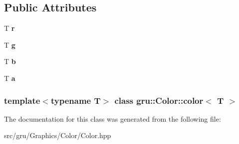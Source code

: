 \subsection*{\-Public \-Attributes}
\begin{DoxyCompactItemize}
\item 
\hypertarget{classgru_1_1Color_1_1color_aee7e839714ca4365e480e9f8af7d51a6}{\-T {\bfseries r}}\label{classgru_1_1Color_1_1color_aee7e839714ca4365e480e9f8af7d51a6}

\item 
\hypertarget{classgru_1_1Color_1_1color_ab3929596a5269939e4e78a22132ac93d}{\-T {\bfseries g}}\label{classgru_1_1Color_1_1color_ab3929596a5269939e4e78a22132ac93d}

\item 
\hypertarget{classgru_1_1Color_1_1color_a8bdd5f13379a4c15567040f27d0e3699}{\-T {\bfseries b}}\label{classgru_1_1Color_1_1color_a8bdd5f13379a4c15567040f27d0e3699}

\item 
\hypertarget{classgru_1_1Color_1_1color_a16a8bbbe15ce0bab9aab97f68a5601cb}{\-T {\bfseries a}}\label{classgru_1_1Color_1_1color_a16a8bbbe15ce0bab9aab97f68a5601cb}

\end{DoxyCompactItemize}
\subsubsection*{template$<$typename \-T$>$ class gru\-::\-Color\-::color$<$ T $>$}



\-The documentation for this class was generated from the following file\-:\begin{DoxyCompactItemize}
\item 
src/gru/\-Graphics/\-Color/\-Color.\-hpp\end{DoxyCompactItemize}
